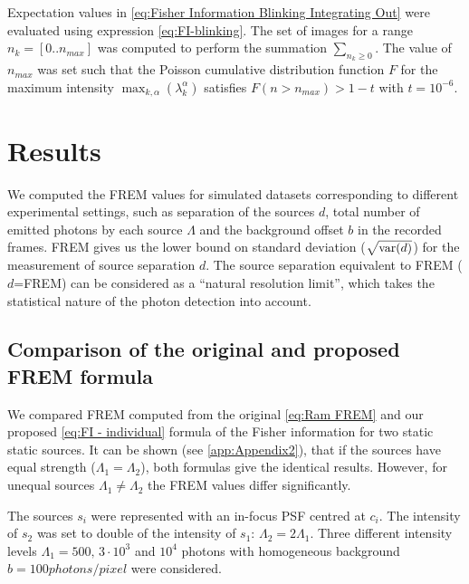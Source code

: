 Expectation values in \autoref{eq:Fisher Information Blinking Integrating Out} were evaluated using expression \autoref{eq:FI-blinking}. The set of images for a range $n_k=[0..n_{max}]$ was computed to perform the summation $\sum_{n_k\geq0}$. The value of $n_{max}$ was set such that the Poisson cumulative distribution function $F$ for the maximum intensity $\max_{k,\alpha}(\lambda_k^\alpha)$ satisfies $F(n>n_{max})>1-t$ with $t=10^{-6}$.


\clearpage
\section{Results\label{sec:FREM results}}

We computed the FREM values for simulated datasets corresponding to different experimental settings, such as separation of the sources $d$, total number of emitted photons by each source $\Lambda$ and the background offset $b$ in the recorded frames. FREM gives us the lower bound on standard deviation ($\sqrt{\mathrm{var}(d)}$) for the measurement of source separation $d$. The source separation equivalent to FREM ($d$=FREM) can be considered as a ``natural resolution limit'', which takes the statistical nature of the photon detection into account.

\subsection{Comparison of the original and proposed FREM formula\label{sec:comparison orig and new FREM}}
%
We compared FREM computed from the original \autoref{eq:Ram FREM} and our proposed \autoref{eq:FI - individual} formula of the Fisher information for two static static sources. It can be shown (see \autoref{app:Appendix2}), that if the sources have equal strength ($\Lambda_1=\Lambda_2$), both formulas give the identical results. However, for unequal sources $\Lambda_1\neq\Lambda_2$ the FREM values differ significantly. 

The sources $s_i$ were represented with an in-focus PSF centred at $c_i$. The intensity of $s_2$ was set to double of the intensity of $s_1$: $\Lambda_2=2\Lambda_1$. Three different intensity levels $\Lambda_1=500,\,3\cdot 10^3$ and $10^4$ photons with homogeneous background $b=100\unit{photons/pixel}$ were considered. 

